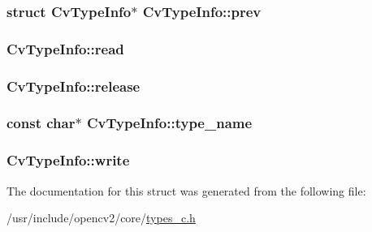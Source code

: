 \hypertarget{structCvTypeInfo_a9a100c3014476d4b29370b7691ee00b8}{
\subsubsection[{prev}]{\setlength{\rightskip}{0pt plus 5cm}struct {\bf Cv\-Type\-Info}$\ast$ Cv\-Type\-Info\-::prev}}\label{structCvTypeInfo_a9a100c3014476d4b29370b7691ee00b8}
\hypertarget{structCvTypeInfo_a6ba91ffbc845274368ea66b9c8319d7c}{
\subsubsection[{read}]{ Cv\-Type\-Info\-::read}}\label{structCvTypeInfo_a6ba91ffbc845274368ea66b9c8319d7c}
\hypertarget{structCvTypeInfo_a710d618588dc17f7c5f6bb54c8e50831}{
\subsubsection[{release}]{ Cv\-Type\-Info\-::release}}\label{structCvTypeInfo_a710d618588dc17f7c5f6bb54c8e50831}
\hypertarget{structCvTypeInfo_a5c2f556a91e33a7551cc563f96e62b64}{
\subsubsection[{type\-\_\-name}]{\setlength{\rightskip}{0pt plus 5cm}const char$\ast$ Cv\-Type\-Info\-::type\-\_\-name}}\label{structCvTypeInfo_a5c2f556a91e33a7551cc563f96e62b64}
\hypertarget{structCvTypeInfo_a55f7489aa2cbcba7d98079014dc8d6ec}{
\subsubsection[{write}]{ Cv\-Type\-Info\-::write}}\label{structCvTypeInfo_a55f7489aa2cbcba7d98079014dc8d6ec}


The documentation for this struct was generated from the following file\-:\begin{DoxyCompactItemize}
\item 
/usr/include/opencv2/core/\hyperlink{core_2types__c_8h}{types\-\_\-c.\-h}\end{DoxyCompactItemize}
